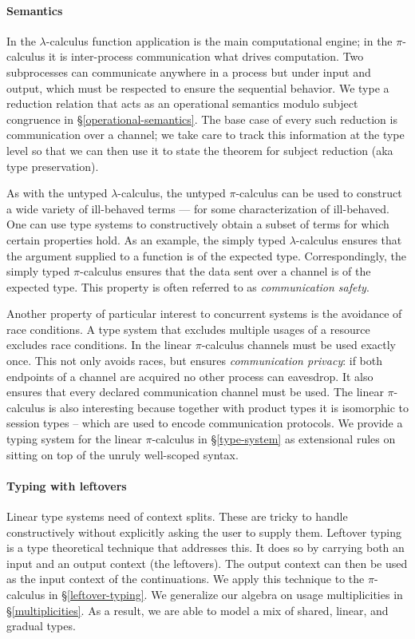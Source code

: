 \documentclass[a4paper,UKenglish,cleveref, autoref, thm-restate,authorcolumns]{lipics-v2019}
\theoremstyle{definition}
\newcommand{\lambdacalc}{$\lambda$-calculus}
\newcommand{\picalc}{$\pi$-calculus}
\begin{document}
\paragraph*{Semantics}
In the \lambdacalc{} function application is the main computational engine; in the \picalc{} it is inter-process communication what drives computation.
Two subprocesses can communicate anywhere in a process but under input and output, which must be respected to ensure the sequential behavior.
We type a reduction relation that acts as an operational semantics modulo subject congruence in \S \ref{operational-semantics}.
The base case of every such reduction is communication over a channel; we take care to track this information at the type level so that we can then use it to state the theorem for subject reduction (aka type preservation).

As with the untyped \lambdacalc{}, the untyped \picalc{} can be used to construct a wide variety of ill-behaved terms --- for some characterization of ill-behaved.
One can use type systems to constructively obtain a subset of terms for which certain properties hold.
As an example, the simply typed \lambdacalc{} ensures that the argument supplied to a function is of the expected type.
Correspondingly, the simply typed \picalc{} \cite{} ensures that the data sent over a channel is of the expected type.
This property is often referred to as \emph{communication safety}.


Another property of particular interest to concurrent systems is the avoidance of race conditions.
A type system that excludes multiple usages of a resource excludes race conditions.
In the linear \picalc{} \cite{} channels must be used exactly once.
This not only avoids races, but ensures \emph{communication privacy}: if both endpoints of a channel are acquired no other process can eavesdrop.
It also ensures that every declared communication channel must be used.
The linear \picalc{} is also interesting because together with product types it is isomorphic to session types \cite{} -- which are used to encode communication protocols.
We provide a typing system for the linear \picalc{} in \S \ref{type-system} as extensional rules on sitting on top of the unruly well-scoped syntax.

\paragraph*{Typing with leftovers}
Linear type systems need of context splits.
These are tricky to handle constructively without explicitly asking the user to supply them.
Leftover typing \cite{} is a type theoretical technique that addresses this.
It does so by carrying both an input and an output context (the leftovers).
The output context can then be used as the input context of the continuations.
We apply this technique to the \picalc{} in \S \ref{leftover-typing}.
We generalize our algebra on usage multiplicities in \S \ref{multiplicities}.
As a result, we are able to model a mix of shared, linear, and gradual types.
\end{document}
